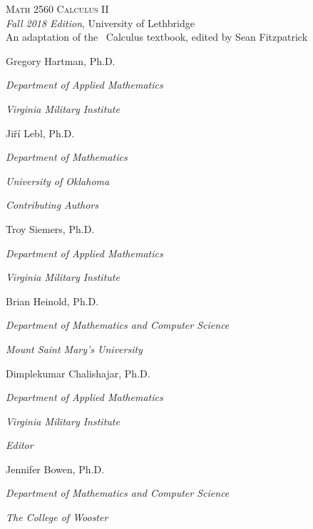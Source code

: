 
\hskip 125pt\begin{minipage}{\textwidth}
\begin{flushright}

\textsc{{\Huge Math 2560 Calculus II}} \\

\textsl{\large Fall 2018 Edition}, 
{\large University of Lethbridge}\\

{An adaptation of the \apex\ Calculus textbook, edited by Sean Fitzpatrick}

\bigskip

\Large

Gregory Hartman, Ph.D.

\emph{\small Department of Applied Mathematics}

\emph{\small Virginia Military Institute}\vskip15pt

Ji{\v r}\'i Lebl, Ph.D.

\emph{\small Department of Mathematics}

\emph{\small University of Oklahoma}

\parbox{200pt}{\textit{Contributing Authors}}\hskip 2cm \phantom{.}

Troy Siemers, Ph.D.

\emph{\small Department of Applied Mathematics}

\emph{\small Virginia Military Institute}\vskip 15pt

Brian Heinold, Ph.D.

\emph{\small Department of Mathematics and Computer Science}

\emph{\small Mount Saint Mary's University}\vskip 15pt

Dimplekumar Chalishajar, Ph.D.

\emph{\small Department of Applied Mathematics}

\emph{\small Virginia Military Institute}\vskip 25pt



\parbox{200pt}{\textit{Editor}}\hskip 2cm \phantom{.}

Jennifer Bowen, Ph.D.

\emph{\small Department of Mathematics and Computer Science}

\emph{\small The College of Wooster}


\normalsize
\end{flushright}
\end{minipage}

